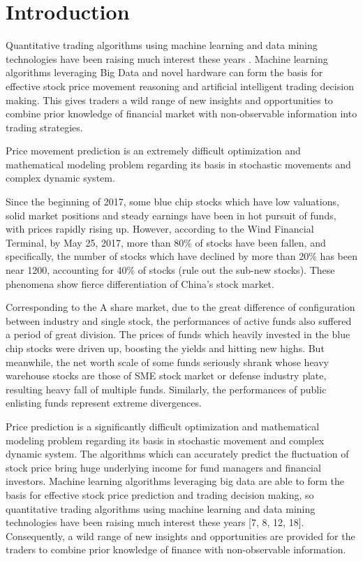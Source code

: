 

\section{Introduction}
\label{sec:intro}

Quantitative trading algorithms using machine learning and data
mining technologies have been raising much interest these years
\cite{fasanghari2010design,cremers2009active,hsu2011hybrid,leung2013discovering}.
Machine learning algorithms leveraging Big Data and novel
hardware can form the basis for effective stock price movement
reasoning and artificial intelligent trading decision making.
This gives traders a wild range of new insights and opportunities
to combine prior knowledge of financial market with non-observable
information into trading strategies.

Price movement prediction is an extremely difficult optimization
and mathematical modeling problem regarding its basis in
stochastic movements and complex dynamic system.

Since the beginning of 2017, some blue chip stocks which have low
valuations, solid market positions and steady earnings have been
in hot pursuit of funds, with prices rapidly rising up. However,
according to the Wind Financial Terminal, by May 25, 2017, more
than 80\% of stocks have been fallen, and specifically, the
number of stocks which have declined by more than 20\% has been
near 1200, accounting for 40\% of stocks (rule out the sub-new
stocks). These phenomena show fierce differentiation of China’s
stock market.

Corresponding to the A share market, due to the great difference
of configuration between industry and single stock, the
performances of active funds also suffered a period of great
division. The prices of funds which heavily invested in the blue
chip stocks were driven up, boosting the yields and hitting new
highs. But meanwhile, the net worth scale of some funds seriously
shrank whose heavy warehouse stocks are those of SME stock market
or defense industry plate, resulting heavy fall of multiple
funds. Similarly, the performances of public enlisting funds
represent extreme divergences.

Price prediction is a significantly difficult optimization and
mathematical modeling problem regarding its basis in stochastic
movement and complex dynamic system. The algorithms which can
accurately predict the fluctuation of stock price bring huge
underlying income for fund managers and financial investors.
Machine learning algorithms leveraging big data are able to form
the basis for effective stock price prediction and trading
decision making, so quantitative trading algorithms using machine
learning and data mining technologies have been raising much
interest these years [7, 8, 12, 18]. Consequently, a wild range
of new insights and opportunities are provided for the traders to
combine prior knowledge of finance with non-observable
information.


